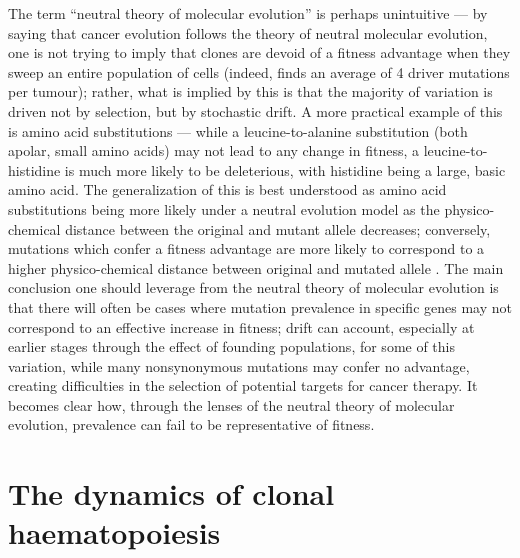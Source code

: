 The term “neutral theory of molecular evolution” is perhaps unintuitive --- by saying that cancer evolution follows the theory of neutral molecular evolution, one is not trying to imply that clones are devoid of a fitness advantage when they sweep an entire population of cells (indeed,  finds an average of 4 driver mutations per tumour); rather, what is implied by this is that the majority of variation is driven not by selection, but by stochastic drift. A more practical example of this is amino acid substitutions --- while a leucine-to-alanine substitution (both apolar, small amino acids) may not lead to any change in fitness, a leucine-to-histidine is much more likely to be deleterious, with histidine being a large, basic amino acid. The generalization of this is best understood as amino acid substitutions being more likely under a neutral evolution model as the physico-chemical distance between the original and mutant allele decreases; conversely, mutations which confer a fitness advantage are more likely to correspond to a higher physico-chemical distance between original and mutated allele \cite{Kimura1979-ps}. The main conclusion one should leverage from the neutral theory of molecular evolution is that there will often be cases where mutation prevalence in specific genes may not correspond to an effective increase in fitness; drift can account, especially at earlier stages through the effect of founding populations, for some of this variation, while many nonsynonymous mutations may confer no advantage, creating difficulties in the selection of potential targets for cancer therapy. It becomes clear how, through the lenses of the neutral theory of molecular evolution, prevalence can fail to be representative of fitness. 

\section{The dynamics of clonal haematopoiesis}

